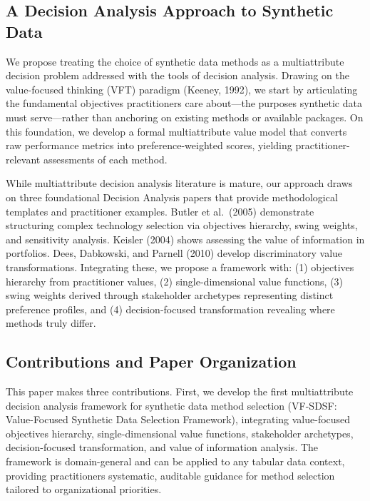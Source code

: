\documentclass[12pt,a4paper]{article}
\begin{document}
\subsection{A Decision Analysis Approach to Synthetic Data}

We propose treating the choice of synthetic data methods as a multiattribute decision problem addressed with the tools of decision analysis. Drawing on the value-focused thinking (VFT) paradigm (Keeney, 1992), we start by articulating the fundamental objectives practitioners care about---the purposes synthetic data must serve---rather than anchoring on existing methods or available packages. On this foundation, we develop a formal multiattribute value model that converts raw performance metrics into preference-weighted scores, yielding practitioner-relevant assessments of each method.

While multiattribute decision analysis literature is mature, our approach draws on three foundational Decision Analysis papers that provide methodological templates and practitioner examples. Butler et al.\ (2005) demonstrate structuring complex technology selection via objectives hierarchy, swing weights, and sensitivity analysis. Keisler (2004) shows assessing the value of information in portfolios. Dees, Dabkowski, and Parnell (2010) develop discriminatory value transformations. Integrating these, we propose a framework with: (1) objectives hierarchy from practitioner values, (2) single-dimensional value functions, (3) swing weights derived through stakeholder archetypes representing distinct preference profiles, and (4) decision-focused transformation revealing where methods truly differ.

\subsection{Contributions and Paper Organization}

This paper makes three contributions. First, we develop the first multiattribute decision analysis framework for synthetic data method selection (VF-SDSF: Value-Focused Synthetic Data Selection Framework), integrating value-focused objectives hierarchy, single-dimensional value functions, stakeholder archetypes, decision-focused transformation, and value of information analysis. The framework is domain-general and can be applied to any tabular data context, providing practitioners systematic, auditable guidance for method selection tailored to organizational priorities.
\end{document}
